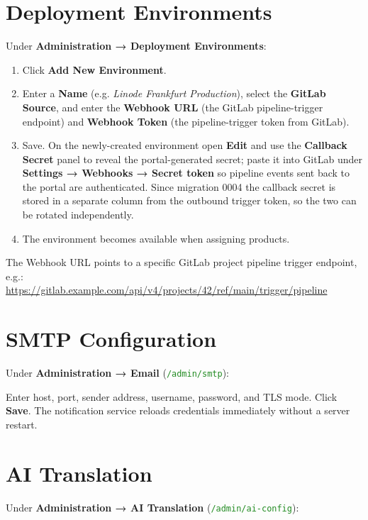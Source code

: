 \documentclass[12pt,a4paper,twoside]{report}
\newcommand{\notebox}[1]{\begin{tcolorbox}[noteboxstyle]#1\end{tcolorbox}}
\newcommand{\route}[1]{\texttt{\textcolor{ForestGreen}{#1}}}
\begin{document}
\section{Deployment Environments}

Under \textbf{Administration → Deployment Environments}:

\begin{enumerate}
  \item Click \textbf{Add New Environment}.
  \item Enter a \textbf{Name} (e.g. \textit{Linode Frankfurt Production}),
        select the \textbf{GitLab Source}, and enter the \textbf{Webhook URL}
        (the GitLab pipeline-trigger endpoint) and \textbf{Webhook Token}
        (the pipeline-trigger token from GitLab).
  \item Save. On the newly-created environment open \textbf{Edit} and use
        the \textbf{Callback Secret} panel to reveal the portal-generated
        secret; paste it into GitLab under \textbf{Settings → Webhooks →
        Secret token} so pipeline events sent back to the portal are
        authenticated. Since migration 0004 the callback secret is stored
        in a separate column from the outbound trigger token, so the two
        can be rotated independently.
  \item The environment becomes available when assigning products.
\end{enumerate}

\notebox{The Webhook URL points to a specific GitLab project pipeline
trigger endpoint, e.g.:\\
\url{https://gitlab.example.com/api/v4/projects/42/ref/main/trigger/pipeline}}

\section{SMTP Configuration}

Under \textbf{Administration → Email} (\route{/admin/smtp}):

Enter host, port, sender address, username, password, and TLS mode.
Click \textbf{Save}. The notification service reloads credentials
immediately without a server restart.

\section{AI Translation}
\label{sec:aitranslation}

Under \textbf{Administration → AI Translation} (\route{/admin/ai-config}):
\end{document}

